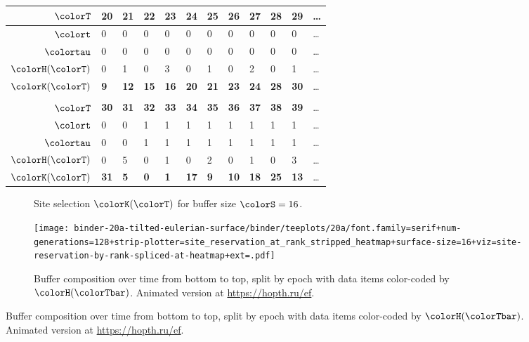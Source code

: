 \begin{figure}[htbp!]
\begin{minipage}{\linewidth}
\begin{tabularx}{\linewidth}{@{}r|*{11}{Y}@{}}
  { $\colorT$} &
    \textbf{20} & \textbf{21} & \textbf{22} & \textbf{23} & \textbf{24}
    & \textbf{25} & \textbf{26} & \textbf{27} & \textbf{28} & \textbf{29} & \ldots \\ \hline
  { $\colort$} &
    0 & 0 & 0 & 0 & 0 & 0 & 0 & 0 & 0 & 0 & \ldots \\
  { $\colortau$} &
    0 & 0 & 0 & 0 & 0 & 0 & 0 & 0 & 0 & 0 & \ldots \\
  { $\colorH(\colorT)$} &
    0 & 1 & 0 & 3 & 0 & 1 & 0 & 2 & 0 & 1 & \ldots \\
  { $\colorK(\colorT)$} &
    \textbf{9} & \textbf{12} & \textbf{15} & \textbf{16} & \textbf{20}
    & \textbf{21} & \textbf{23} & \textbf{24} & \textbf{28} & \textbf{30} & \ldots \\
   \\[1ex]

  { $\colorT$} &
    \textbf{30} & \textbf{31} & \textbf{32} & \textbf{33} & \textbf{34}
    & \textbf{35} & \textbf{36} & \textbf{37} & \textbf{38} & \textbf{39} & \ldots \\ \hline
  { $\colort$} &
    0 & 0 & 1 & 1 & 1 & 1 & 1 & 1 & 1 & 1 & \ldots \\
  { $\colortau$} &
    0 & 0 & 1 & 1 & 1 & 1 & 1 & 1 & 1 & 1 & \ldots \\
  { $\colorH(\colorT)$} &
    0 & 5 & 0 & 1 & 0 & 2 & 0 & 1 & 0 & 3 & \ldots \\
  { $\colorK(\colorT)$} &
    \textbf{31} & \textbf{5} & \textbf{0} & \textbf{1} & \textbf{17}
    & \textbf{9} & \textbf{10} & \textbf{18} & \textbf{25} & \textbf{13} & \ldots \\

  \end{tabularx}
  \vspace{-2ex}
\end{minipage}


\begin{subfigure}{\linewidth}
\caption{\footnotesize Site selection $\colorK(\colorT)$ for buffer size $\colorS=16$.}
\label{fig:hsurf-tilted-implementation-site-selection}
\end{subfigure}
\vspace{-3ex}

\begin{subfigure}[b]{\linewidth}
\texttt{[image: 
binder-20a-tilted-eulerian-surface/binder/teeplots/20a/font.family=serif+num-generations=128+strip-plotter=site\_reservation\_at\_rank\_stripped\_heatmap+surface-size=16+viz=site-reservation-by-rank-spliced-at-heatmap+ext=.pdf]}
\vspace{-4.5ex}\caption{\footnotesize
  Buffer composition over time from bottom to top, split by epoch with data items color-coded by \hv{} $\colorH(\colorTbar)$.
  Animated version at \url{https://hopth.ru/ef}.
}
\label{fig:hsurf-tilted-implementation-schematic}
\end{subfigure}


\end{figure}
